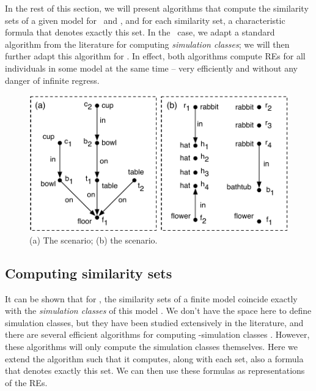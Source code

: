 In the rest of this section, we will present algorithms that compute
the similarity sets of a given model for \alc\ and \el, and for each
similarity set, a characteristic formula that denotes exactly this
set.  In the \alc\ case, we adapt a standard algorithm from the
literature for computing \emph{simulation classes}; we will then
further adapt this algorithm for \el.  In effect, both algorithms
compute REs for all individuals in some model at the same time -- very
efficiently and without any danger of infinite regress.


\begin{figure}[t]
  \centering
  \includegraphics[width=\columnwidth]{pic-dale-haddock}
  \caption{(a) The 
    scenario; (b) the  scenario.}
  \label{fig:dale-haddock}
\end{figure}


\subsection{Computing similarity sets}

It can be shown that for \alc, the similarity sets of a finite model
coincide exactly with the \emph{simulation classes} of this model
\cite{blac:moda01}.  We don't have the space here to define simulation
classes, but they have been studied extensively in the literature, and
there are several efficient algorithms for computing \alc-simulation
classes
\cite{hopc:algo71,paig:thre87,dovier04:_effic_algor_for_comput_bisim_equiv}.
However, these algorithms will only compute the simulation classes
themselves. Here we extend the  algorithm such
that it computes, along with each set, also a formula that denotes
exactly this set.  We can then use these formulas as representations
of the REs.

